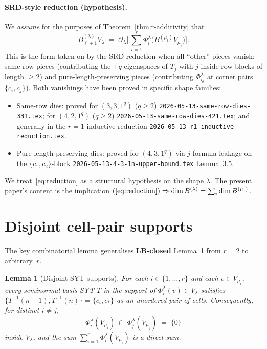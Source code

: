 \documentclass[11pt]{article}
\newtheorem{lemma}[theorem]{Lemma}
\theoremstyle{definition}
\begin{document}
\paragraph{SRD-style reduction (hypothesis).}
We \emph{assume} for the purposes of Theorem~\ref{thm:r-additivity}
that
\begin{equation}\label{eq:reduction}
   B_{\ell+1}^{(\lambda)} V_\lambda
   \;=\;
   \mathcal{O}_\lambda \Big[\,
      \sum_{i=1}^r \Phi_i^\lambda\big(B^{(\mu_i)} V_{\mu_i}\big)
   \Big].
\end{equation}
This is the form taken on by the SRD reduction when all
``other'' pieces vanish: same-row pieces (contributing the
$+q$-eigenspaces of $T_j$ with $j$ inside row blocks of length $\ge 2$)
and pure-length-preserving pieces (contributing $\Phi_{ij}^\lambda$ at
corner pairs $\{c_i, c_j\}$). Both vanishings have been proved in
specific shape families:
\begin{itemize}[leftmargin=2em,topsep=0.2em,itemsep=0.1em]
\item Same-row dies: proved for $(3, 3, 1^q)$ ($q \ge 2$)
   \texttt{2026-05-13-same-row-dies-331.tex}; for $(4, 2, 1^q)$
   ($q \ge 2$) \texttt{2026-05-13-same-row-dies-421.tex}; and
   generally in the $r = 1$ inductive reduction
   \texttt{2026-05-13-r1-inductive-reduction.tex}.
\item Pure-length-preserving dies: proved for $(4, 3, 1^q)$ via
   $j$-formula leakage on the $\{c_1, c_2\}$-block
   \texttt{2026-05-13-4-3-1n-upper-bound.tex} Lemma~3.5.
\end{itemize}
We treat~\eqref{eq:reduction} as a structural hypothesis on the shape
$\lambda$. The present paper's content is the implication
$(\text{\eqref{eq:reduction}}) \Rightarrow \dim B^{(\lambda)} = \sum_i \dim B^{(\mu_i)}$.

\section{Disjoint cell-pair supports}\label{sec:disjoint}

The key combinatorial lemma generalises \textbf{LB-closed} Lemma~1
from $r = 2$ to arbitrary~$r$.

\begin{lemma}[Disjoint SYT supports]\label{lem:disjoint}
For each $i \in \{1, \ldots, r\}$ and each $v \in V_{\mu_i}$, every
seminormal-basis SYT $T$ in the support of $\Phi_i^\lambda(v) \in V_\lambda$
satisfies $\{T^{-1}(n-1), T^{-1}(n)\} = \{c_i, c_*\}$ as an
unordered pair of cells. Consequently, for distinct $i \ne j$,
\[
   \Phi_i^\lambda(V_{\mu_i}) \;\cap\; \Phi_j^\lambda(V_{\mu_j}) \;=\; \{0\}
\]
inside $V_\lambda$, and the sum
$\sum_{i=1}^r \Phi_i^\lambda(V_{\mu_i})$ is a direct sum.
\end{lemma}
\end{document}
